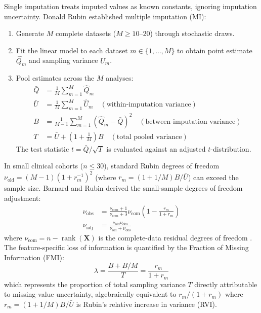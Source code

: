 \documentclass[11pt,oneside]{book}
\begin{document}
Single imputation treats imputed values as known constants, ignoring imputation uncertainty. Donald Rubin \cite{rubin1987multiple} established multiple imputation (MI):
\begin{enumerate}
    \item Generate $M$ complete datasets ($M \ge 10$--$20$) through stochastic draws.
    \item Fit the linear model to each dataset $m \in \{1, \dots, M\}$ to obtain point estimate $\hat{Q}_m$ and sampling variance $\hat{U}_m$.
    \item Pool estimates across the $M$ analyses:
    \begin{align}
    \bar{Q} &= \frac{1}{M}\sum_{m=1}^M \hat{Q}_m \\
    \bar{U} &= \frac{1}{M}\sum_{m=1}^M \hat{U}_m \quad (\text{within-imputation variance}) \\
    B &= \frac{1}{M - 1}\sum_{m=1}^M (\hat{Q}_m - \bar{Q})^2 \quad (\text{between-imputation variance}) \\
    T &= \bar{U} + \left(1 + \frac{1}{M}\right) B \quad (\text{total pooled variance})
    \end{align}
    The test statistic $t = \bar{Q} / \sqrt{T}$ is evaluated against an adjusted $t$-distribution.
\end{enumerate}

In small clinical cohorts ($n \le 30$), standard Rubin degrees of freedom $\nu_{\text{old}} = (M-1)(1 + r_m^{-1})^2$ (where $r_m = (1 + 1/M)B / \bar{U}$) can exceed the sample size. Barnard and Rubin \cite{barnard1999small} derived the small-sample degrees of freedom adjustment:
\begin{align}
\nu_{\text{obs}} &= \frac{\nu_{\text{com}} + 1}{\nu_{\text{com}} + 3} \nu_{\text{com}} \left(1 - \frac{r_m}{1 + r_m}\right) \\
\nu_{\text{adj}} &= \frac{\nu_{\text{old}} \nu_{\text{obs}}}{\nu_{\text{old}} + \nu_{\text{obs}}}
\end{align}
where $\nu_{\text{com}} = n - \operatorname{rank}(\mathbf{X})$ is the complete-data residual degrees of freedom \cite{barnard1999small}. The feature-specific loss of information is quantified by the Fraction of Missing Information (FMI):
\begin{equation}
\label{eq:fmi_lambda}
\lambda = \frac{B + B/M}{T} = \frac{r_m}{1 + r_m}
\end{equation}
which represents the proportion of total sampling variance $T$ directly attributable to missing-value uncertainty, algebraically equivalent to $r_m / (1 + r_m)$ where $r_m = (1 + 1/M)B / \bar{U}$ is Rubin's relative increase in variance (RVI).
\end{document}
